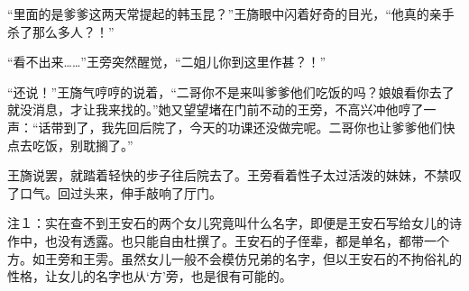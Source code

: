 “里面的是爹爹这两天常提起的韩玉昆？”王旖眼中闪着好奇的目光，“他真的亲手杀了那么多人？！”

“看不出来……”王旁突然醒觉，“二姐儿你到这里作甚？！”

“还说！”王旖气哼哼的说着，“二哥你不是来叫爹爹他们吃饭的吗？娘娘看你去了就没消息，才让我来找的。”她又望望堵在门前不动的王旁，不高兴冲他哼了一声：“话带到了，我先回后院了，今天的功课还没做完呢。二哥你也让爹爹他们快点去吃饭，别耽搁了。”

王旖说罢，就踏着轻快的步子往后院去了。王旁看着性子太过活泼的妹妹，不禁叹了口气。回过头来，伸手敲响了厅门。

注１：实在查不到王安石的两个女儿究竟叫什么名字，即便是王安石写给女儿的诗作中，也没有透露。也只能自由杜撰了。王安石的子侄辈，都是单名，都带一个方。如王旁和王雱。虽然女儿一般不会模仿兄弟的名字，但以王安石的不拘俗礼的性格，让女儿的名字也从‘方’旁，也是很有可能的。

